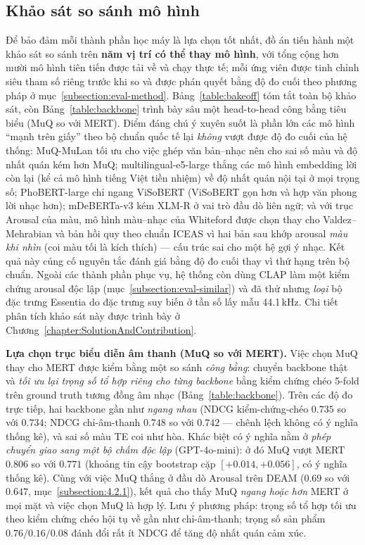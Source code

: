 \documentclass[../DoAn.tex]{subfiles}
\begin{document}
\subsection{Khảo sát so sánh mô hình}
\label{subsection:eval-bakeoff}
Để bảo đảm mỗi thành phần học máy là lựa chọn tốt nhất, đồ án tiến hành một khảo sát so sánh trên \textbf{năm vị trí có thể thay mô hình}, với tổng cộng hơn mười mô hình tiên tiến được tải về và chạy thực tế; mỗi ứng viên được tinh chỉnh siêu tham số riêng trước khi so và được phán quyết bằng độ đo cuối theo phương pháp ở mục~\ref{subsection:eval-method}. Bảng~\ref{table:bakeoff} tóm tắt toàn bộ khảo sát, còn Bảng~\ref{table:backbone} trình bày sâu một head-to-head công bằng tiêu biểu (MuQ so với MERT). Điểm đáng chú ý xuyên suốt là phần lớn các mô hình ``mạnh trên giấy'' theo bộ chuẩn quốc tế lại \textit{không} vượt được độ đo cuối của hệ thống: MuQ-MuLan tối ưu cho việc ghép văn bản--nhạc nên cho sai số màu và độ nhất quán kém hơn MuQ; multilingual-e5-large \cite{wang2024e5} thắng các mô hình embedding lời còn lại (kể cả mô hình tiếng Việt tiền nhiệm) về độ nhất quán nội tại ở mọi trọng số; PhoBERT-large chỉ ngang ViSoBERT (ViSoBERT gọn hơn và hợp văn phong lời nhạc hơn); mDeBERTa-v3 kém XLM-R ở vai trò đầu dò liên ngữ; và với trục Arousal của màu, mô hình màu--nhạc của Whiteford được chọn thay cho Valdez--Mehrabian và bản hồi quy theo chuẩn ICEAS vì hai bản sau khớp arousal \textit{màu khi nhìn} (coi màu tối là kích thích) --- cấu trúc sai cho một hệ gợi ý nhạc. Kết quả này củng cố nguyên tắc đánh giá bằng độ đo cuối thay vì thứ hạng trên bộ chuẩn. Ngoài các thành phần phục vụ, hệ thống còn dùng CLAP làm một kiểm chứng arousal độc lập (mục~\ref{subsection:eval-similar}) và đã thử nhưng \textit{loại} bộ đặc trưng Essentia do đặc trưng suy biến ở tần số lấy mẫu 44.1\,kHz. Chi tiết phân tích khảo sát này được trình bày ở Chương~\ref{chapter:SolutionAndContribution}.

\textbf{Lựa chọn trục biểu diễn âm thanh (MuQ so với MERT).} Việc chọn MuQ thay cho MERT được kiểm bằng một so sánh \textit{công bằng}: chuyển backbone thật và \textit{tối ưu lại trọng số tổ hợp riêng cho từng backbone} bằng kiểm chứng chéo 5-fold trên ground truth tương đồng âm nhạc (Bảng~\ref{table:backbone}). Trên các độ đo trực tiếp, hai backbone gần như \textit{ngang nhau} (NDCG kiểm-chứng-chéo $0.735$ so với $0.734$; NDCG chỉ-âm-thanh $0.748$ so với $0.742$ --- chênh lệch không có ý nghĩa thống kê), và sai số màu TE coi như hòa. Khác biệt có ý nghĩa nằm ở \textit{phép chuyển giao sang một bộ chấm độc lập} (GPT-4o-mini): ở đó MuQ vượt MERT $0.806$ so với $0.771$ (khoảng tin cậy bootstrap cặp $[+0.014, +0.056]$, có ý nghĩa thống kê). Cùng với việc MuQ thắng ở đầu dò Arousal trên DEAM ($0.69$ so với $0.647$, mục~\ref{subsection:4.2.1}), kết quả cho thấy MuQ \textit{ngang hoặc hơn} MERT ở mọi mặt và việc chọn MuQ là hợp lý. Lưu ý phương pháp: trọng số tổ hợp tối ưu theo kiểm chứng chéo hội tụ về gần như chỉ-âm-thanh; trọng số sản phẩm $0.76/0.16/0.08$ đánh đổi rất ít NDCG để tăng độ nhất quán cảm xúc.
\end{document}

